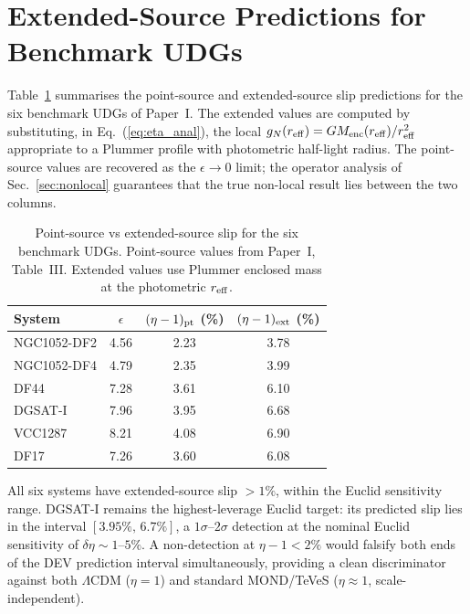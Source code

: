 \documentclass[aps,prd,twocolumn,superscriptaddress,nofootinbib]{revtex4-2}
\newcommand{\LCDM}{$\Lambda$CDM}
\begin{document}
\section{Extended-Source Predictions for Benchmark UDGs}
\label{sec:udg}

Table~\ref{tab:udg_ext} summarises the point-source and
extended-source slip predictions for the six benchmark
UDGs of Paper~I. The extended values are computed by
substituting, in Eq.~(\ref{eq:eta_anal}), the local
$g_N(r_{\rm eff}) = G M_{\rm enc}(r_{\rm eff})/r_{\rm eff}^2$
appropriate to a Plummer profile with photometric
half-light radius. The point-source values are recovered
as the $\epsilon \to 0$ limit; the operator
analysis of Sec.~\ref{sec:nonlocal} guarantees that the
true non-local result lies between the two columns.

\begin{table}[h]
\caption{Point-source vs extended-source slip for the six
benchmark UDGs. Point-source values from Paper~I,
Table~III. Extended values use Plummer enclosed mass at
the photometric $r_{\rm eff}$.}
\label{tab:udg_ext}
\begin{ruledtabular}
\begin{tabular}{lccc}
System & $\epsilon$ & $(\eta-1)_{\rm pt}$ (\%)
                    & $(\eta-1)_{\rm ext}$ (\%) \\
\hline
NGC1052-DF2 & 4.56 & 2.23 & 3.78 \\
NGC1052-DF4 & 4.79 & 2.35 & 3.99 \\
DF44        & 7.28 & 3.61 & 6.10 \\
DGSAT-I     & 7.96 & 3.95 & 6.68 \\
VCC1287     & 8.21 & 4.08 & 6.90 \\
DF17        & 7.26 & 3.60 & 6.08 \\
\end{tabular}
\end{ruledtabular}
\end{table}

All six systems have extended-source slip $>1\%$,
within the Euclid sensitivity range.
DGSAT-I remains the highest-leverage Euclid target:
its predicted slip lies in the interval
$[3.95\%,\,6.7\%]$, a $1\sigma$--$2\sigma$ detection
at the nominal Euclid sensitivity of
$\delta\eta\sim 1$--$5\%$.
A non-detection at $\eta-1 < 2\%$ would falsify both
ends of the DEV prediction interval simultaneously,
providing a clean discriminator against both \LCDM{}
($\eta=1$) and standard MOND/TeVeS ($\eta\approx1$,
scale-independent).
\end{document}
